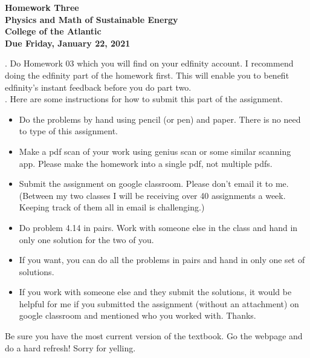 \documentclass[12pt]{article}
\begin{document}
\pagestyle{empty}
 
\begin{center}
{\LARGE {\bf Homework Three}}\\
\bigskip
{\Large {\bf Physics and Math of Sustainable Energy}}\\
\bigskip
{\Large {\bf College of the Atlantic}}\\
\bigskip
{ {\bf Due Friday, January 22, 2021}}\\ 
\end{center}
\medskip



.  Do Homework 03 which you will find
on your edfinity account.  I recommend doing the edfinity part of the
homework first.  This will enable you to benefit edfinity's instant
feedback before you do part two.\\


.  Here are some
instructions for how to submit this part of the assignment.
\begin{itemize}
\setlength{\itemsep}{0mm}
\item Do the problems by hand using pencil (or pen) and paper.
  There is no need to type of this assignment.
\item Make a pdf scan of your work using genius scan or some
  similar scanning app.  Please make the homework into a single
  pdf, not multiple pdfs. 
\item Submit the assignment on google classroom.  Please don't
  email it to me.  (Between my two classes I will be receiving
  over 40 assignments a week.  Keeping track of them all in email
  is challenging.)
\item Do problem 4.14 in pairs. Work with someone else in the class
  and hand in only one solution for the two of you.
\item If you want, you can do all the problems in pairs and hand
  in only one set of solutions.
\item If you work with someone else and they submit the solutions, it
  would be helpful for me if you submitted the assignment (without an
  attachment) on google classroom and mentioned who you worked with.
  Thanks. 

\end{itemize}


  Be sure you have the most
current version of the textbook.  Go the webpage and do a hard
refresh!  Sorry for yelling.\\ 
\end{document}
